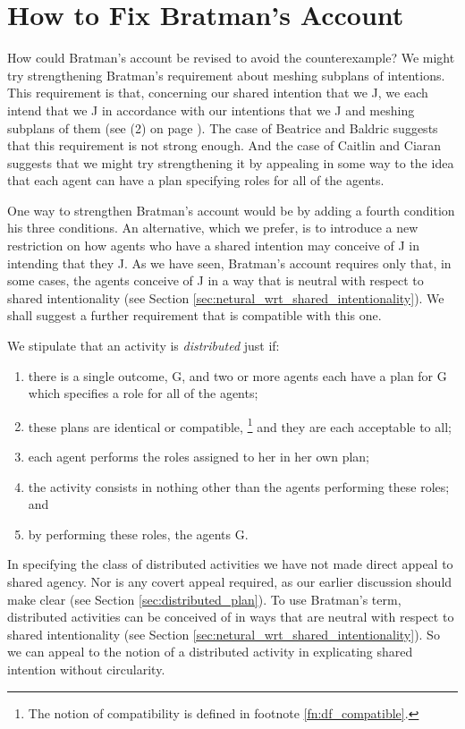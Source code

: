 \documentclass[12pt,\papersize]{extarticle}
\begin{document}
\section{How to Fix Bratman's Account}
\label{sec:fix}

How could Bratman's account be revised to avoid the counterexample?
We might try strengthening Bratman's requirement about meshing subplans of intentions.
This requirement is that, concerning our shared intention that we J, we each intend that we J in accordance with our intentions that we J and meshing subplans of them (see (2) on page \pageref{quote:bratman_account}).
The case of Beatrice and Baldric suggests that this requirement is not strong enough.
And the case of Caitlin and Ciaran suggests that we might try strengthening it by appealing in some way to the idea that each agent can have a plan specifying roles for all of the agents.

One way to strengthen Bratman's account would be by adding a fourth condition his three conditions.
An alternative, which we prefer, is to introduce a new restriction on how agents who have a shared intention may conceive of J in intending that they J.
As we have seen, Bratman's account requires only that, in some cases, the agents conceive of J in a way that is neutral with respect to shared intentionality (see Section \vref{sec:netural_wrt_shared_intentionality}).
We shall suggest a further requirement that is compatible with this one.

We stipulate that an activity is \emph{distributed} just if: 
\begin{enumerate}[label=\emph{\alph*})]
\item 	there is a single outcome, G,
	and two or more agents each have a plan for G which specifies a role for all of the agents;	
\item 	these plans are identical or compatible,%
\footnote{
The notion of compatibility is defined in footnote \vref{fn:df_compatible}.
}
%
		and they are each acceptable to all; 
\item	each agent performs the roles assigned to her in her own plan;
\item	the activity consists in nothing other than the agents performing these roles;
	and
\item	by performing these roles, the agents G.

\end{enumerate}
%
In specifying the class of distributed activities we have not made direct appeal to shared agency. 
Nor is any covert appeal required, as our earlier discussion should  make clear (see Section \vref{sec:distributed_plan}).
To use Bratman's term, distributed activities can be conceived of in ways that are neutral with respect to shared intentionality (see Section \vref{sec:netural_wrt_shared_intentionality}).
So we can appeal  to the notion of a distributed activity in explicating shared intention without circularity.
\end{document}
